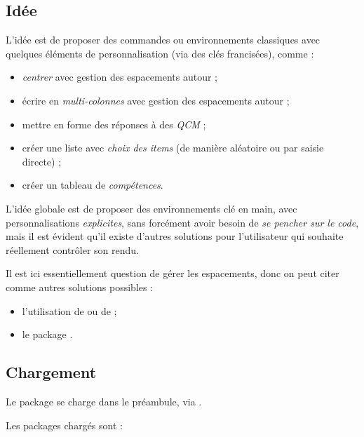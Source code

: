 \documentclass[french,11pt,a4paper]{article}
\begin{document}
\subsection{Idée}

L'idée est de proposer des commandes ou environnements classiques avec quelques éléments de personnalisation (via des \textsf{clés} francisées), comme :

\begin{itemize}
	\item \textit{centrer} avec gestion des espacements autour ;
	\item écrire en \textit{multi-colonnes} avec gestion des espacements autour ;
	\item mettre en forme des réponses à des \textit{QCM} ;
	\item créer une liste avec \textit{choix des items} (de manière aléatoire ou par saisie directe) ;
	\item créer un tableau de \textit{compétences}.
\end{itemize}

\smallskip

L'idée globale est de proposer des environnements clé en main, avec personnalisations \textit{explicites}, sans forcément avoir besoin de \textit{se pencher sur le code}, mais il est évident qu'il existe d'autres solutions pour l'utilisateur qui souhaite réellement contrôler son rendu.

\smallskip

Il est ici essentiellement question de gérer les espacements, donc on peut citer comme autres solutions possibles :

\begin{itemize}
	\item l'utilisation de  ou de  ;
	\item le package .
\end{itemize}

\subsection{Chargement}

Le package se charge dans le préambule, via .

Les packages chargés sont :
\end{document}
